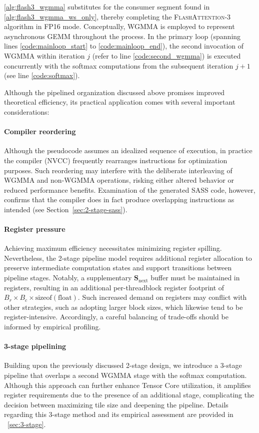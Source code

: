 \cref{alg:flash3_wgmma} substitutes for the consumer segment found in \cref{alg:flash3_wgmma_ws_only}, thereby completing the \textsc{FlashAttention-3} algorithm in FP16 mode. Conceptually, WGMMA is employed to represent asynchronous GEMM throughout the process. In the primary loop (spanning lines \ref{code:mainloop_start} to \ref{code:mainloop_end}), the second invocation of WGMMA within iteration $j$ (refer to line \ref{code:second_wgmma}) is executed concurrently with the softmax computations from the subsequent iteration $j+1$ (see line \ref{code:softmax}).

Although the pipelined organization discussed above promises improved theoretical efficiency, its practical application comes with several important considerations:

\paragraph{Compiler reordering} Although the pseudocode assumes an idealized sequence of execution, in practice the compiler (NVCC) frequently rearranges instructions for optimization purposes. Such reordering may interfere with the deliberate interleaving of WGMMA and non-WGMMA operations, risking either altered behavior or reduced performance benefits. Examination of the generated SASS code, however, confirms that the compiler does in fact produce overlapping instructions as intended (see Section~\ref{sec:2-stage-sass}).

\paragraph{Register pressure} Achieving maximum efficiency necessitates minimizing register spilling. Nevertheless, the 2-stage pipeline model requires additional register allocation to preserve intermediate computation states and support transitions between pipeline stages. Notably, a supplementary $\mathbf{S}_{\mathrm{next}}$ buffer must be maintained in registers, resulting in an additional per-threadblock register footprint of $B_r \times B_c \times \text{sizeof}(\text{float})$. Such increased demand on registers may conflict with other strategies, such as adopting larger block sizes, which likewise tend to be register-intensive. Accordingly, a careful balancing of trade-offs should be informed by empirical profiling.

\paragraph{3-stage pipelining} Building upon the previously discussed 2-stage design, we introduce a 3-stage pipeline that overlaps a second WGMMA stage with the softmax computation. Although this approach can further enhance Tensor Core utilization, it amplifies register requirements due to the presence of an additional stage, complicating the decision between maximizing tile size and deepening the pipeline. Details regarding this 3-stage method and its empirical assessment are provided in ~\cref{sec:3-stage}.

